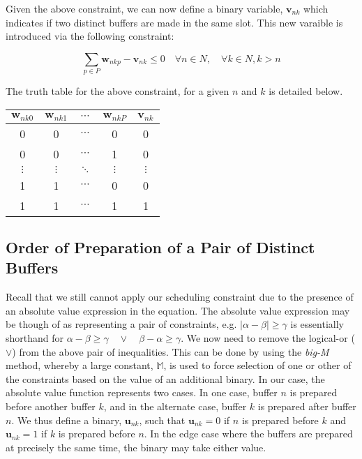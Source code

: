 Given the above constraint, we can now define a binary variable, 
$ \boldsymbol{v}_{nk} $ which indicates if two distinct buffers are made in the
same slot.
This new varaible is introduced via the following constraint:

\begin{equation}
    \sum_{p \in P} \boldsymbol{w}_{nkp} - \boldsymbol{v}_{nk} \le 0 \quad
    \forall n \in N, \quad \forall k \in N, k > n
\end{equation}

The truth table for the above constraint, for a given $n$ and $k$ is detailed
 below.

\begin{center}
    \begin{tabular}{c c c c | c}
        $\boldsymbol{w}_{nk0}$ & $\boldsymbol{w}_{nk1}$ & $\cdots$
        & $\boldsymbol{w}_{nkP}$ & $\boldsymbol{v}_{nk}$ \\ \hline
        0 & 0 & $\cdots$ & 0 & 0\\
        0 & 0 & $\cdots$ & 1 & 0\\
        $\vdots$ & $\vdots$ & $\ddots$ & $\vdots$ & $\vdots$\\
        1 & 1 & $\cdots$ & 0 & 0\\
        1 & 1 & $\cdots$ & 1 & 1\\
    \end{tabular}
\end{center}

\subsection{Order of Preparation of a Pair of Distinct Buffers}\label{SS.constr8}

Recall that we still cannot apply our scheduling constraint due to the presence
of an absolute value expression in the equation.
The absolute value expression may be though of as representing a pair of 
constraints, e.g.
$ \lvert \alpha - \beta \rvert \ge \gamma $
is essentially shorthand for
$ \alpha - \beta \ge \gamma \quad \lor \quad \beta - \alpha \ge \gamma $. 
We now need to remove the logical-or ($\lor$) from the above pair of
inequalities.
This can be done by using the \emph{big-M} method, whereby a large constant,
$ \mathbb{M} $, is used to force selection of one or other of the constraints
based on the value of an additional binary.
In our case, the absolute value function represents two cases.
In one case, buffer $n$ is prepared before another buffer $k$, and in the
alternate case, buffer $k$ is prepared after buffer $n$.
We thus define a binary, $\boldsymbol{u}_{nk}$, such that
$ \boldsymbol{u}_{nk} = 0 $ if $n$ is prepared before $k$ and
$ \boldsymbol{u}_{nk} = 1 $ if $k$ is prepared before $n$.
In the edge case where the buffers are prepared at precisely the same time,
the binary may take either value.

